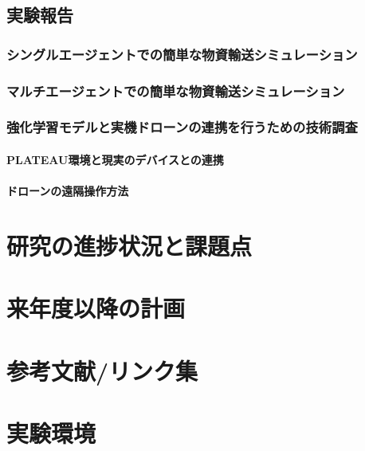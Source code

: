 \documentclass{article}[jsarticle]
\begin{document}
\subsection{実験報告}
\subsubsection{シングルエージェントでの簡単な物資輸送シミュレーション}

\subsubsection{マルチエージェントでの簡単な物資輸送シミュレーション}

\subsubsection{強化学習モデルと実機ドローンの連携を行うための技術調査}
\paragraph{PLATEAU環境と現実のデバイスとの連携}
\paragraph{ドローンの遠隔操作方法}


\section{研究の進捗状況と課題点}

\section{来年度以降の計画}

\section{参考文献/リンク集}

\section{実験環境}
\end{document}
